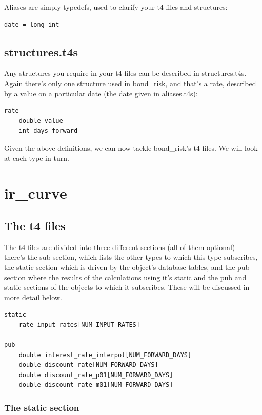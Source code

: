 \documentclass{report}
\begin{document}
Aliases are simply typedefs, used to clarify your t4 files and structures:

\begin{verbatim}
date = long int
\end{verbatim}

\subsection{structures.t4s}

Any structures you require in your t4 files can be described in structures.t4s. Again there's only one structure used in bond_risk, and that's a rate, described by a value on a particular date (the date given in aliases.t4s):

\begin{verbatim}
rate
    double value
    int days_forward
\end{verbatim}

Given the above definitions, we can now tackle bond_risk's t4 files. We will look at each type in turn.

\section{ir_curve}

\subsection{The t4 files}

The t4 files are divided into three different sections (all of them optional) - there's the sub section, which lists the other types to which this type subscribes, the static section which is driven by the object's database tables, and the pub section where the results of the calculations using it's static and the pub and static sections of the objects to which it subscribes. These will be discussed in more detail below.

\begin{verbatim}
static
    rate input_rates[NUM_INPUT_RATES]

pub
    double interest_rate_interpol[NUM_FORWARD_DAYS]
    double discount_rate[NUM_FORWARD_DAYS]
    double discount_rate_p01[NUM_FORWARD_DAYS]
    double discount_rate_m01[NUM_FORWARD_DAYS]
\end{verbatim}

\subsubsection{The static section}
\end{document}
